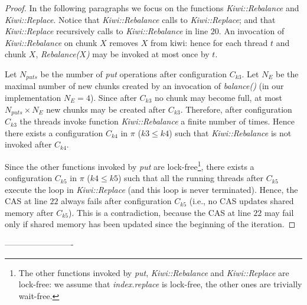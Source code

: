 \begin{proof}
In the following paragraphs we focus on the functions \emph{Kiwi::Rebalance} and \emph{Kiwi::Replace}.
Notice that \emph{Kiwi::Rebalance} calls to \emph{Kiwi::Replace}; and that \emph{Kiwi::Replace} recursively calls to \emph{Kiwi::Rebalance} in line $20$.
An invocation of \emph{Kiwi::Rebalance} on chunk $X$ removes $X$ from kiwi:
hence for each thread $t$ and chunk $X$, \emph{Rebalance($X$)} may be invoked at most once by $t$.

Let $N_{puts}$ be the number of \emph{put} operations after configuration $C_{k3}$.
Let $N_E$ be the maximal number of new chunks created by an invocation of \emph{balance()} (in our implementation $N_E=4$).
Since after $C_{k3}$ no chunk may become full, at most $N_{puts} \times N_E$ new chunks may be created after $C_{k3}$.
Therefore, after configuration $C_{k3}$ the threads invoke function  \emph{Kiwi::Rebalance} a finite number of times.
Hence there exists a configuration $C_{k4}$ in $\pi$ ($k3 \leq k4$) such that \emph{Kiwi::Rebalance} is not invoked after $C_{k4}$.





Since the other functions invoked by \emph{put} are lock-free\footnote{
The other functions invoked by \emph{put}, \emph{Kiwi::Rebalance} and \emph{Kiwi::Replace} are lock-free:
we assume that \emph{index.replace} is lock-free, the other ones are trivially wait-free.},
there exists a configuration $C_{k5}$ in $\pi$ ($k4 \leq k5$) such that all the running threads
after $C_{k5}$ execute the loop in \emph{Kiwi::Replace} (and this loop is never terminated).
%
Hence, the CAS at line $22$ always fails after configuration $C_{k5}$ (i.e., no CAS updates shared memory after $C_{k5}$).
This is a contradiction, because the  CAS at line $22$ may fail only if shared memory has been updated since the beginning of the iteration.



%
%
%

\end{proof}
-------------------------